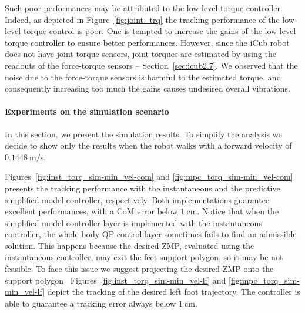 \par
Such poor performances may be attributed to the low-level torque controller. Indeed, as depicted in Figure~\ref{fig:joint_trq} the tracking performance of the low-level torque control is poor. One is tempted to increase the gains of the low-level torque controller to ensure better performances. However, since the iCub robot does not have joint torque sensors, joint torques are estimated by using the readouts of the force-torque sensors -- Section~\ref{sec:icub2.7}. We observed that the noise due to the force-torque sensors is harmful to the estimated torque, and consequently increasing too much the gains causes undesired overall vibrations.

\paragraph{Experiments on the simulation scenario}
In this section, we present the simulation results. To simplify the analysis we decide to show only the results when the robot walks with a forward velocity of $\SI{0.1448}{\meter \per \second}$. 
\par
Figures~\ref{fig:inst_torq_sim-min_vel-com} and \ref{fig:mpc_torq_sim-min_vel-com} presents the tracking performance with the instantaneous and the predictive simplified model controller, respectively. Both implementations guarantee excellent performances, with a CoM error below $\SI{1}{\centi \meter}$. 
Notice that when the simplified model controller layer is implemented with the instantaneous controller, the whole-body QP control layer sometimes fails to find an admissible solution. This happens because the desired ZMP, evaluated using the instantaneous controller, may exit the feet support polygon, so it may be not feasible. To face this issue we suggest projecting the desired ZMP onto the support polygon~\citep{Englsberger2011}
Figures~\ref{fig:inst_torq_sim-min_vel-lf} and \ref{fig:mpc_torq_sim-min_vel-lf} depict the tracking of the desired left foot trajectory. The controller is able to guarantee a tracking error always below $\SI{1}{\centi\meter}$.
